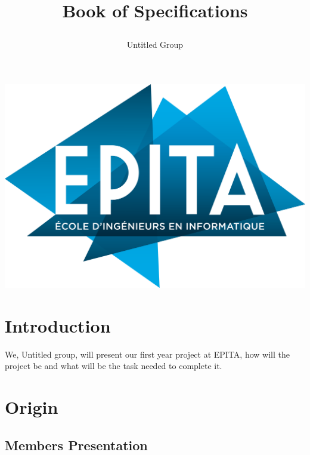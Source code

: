 \documentclass[a4paper, 11pt] {article}
\title{\begin{center} \hspace{1.5cm} Book of Specifications \end{center}}
\author{Untitled Group}
\begin{document}
\maketitle
\begin{center}
    \includegraphics[width = \linewidth]{Epita.png}
\end{center}

\newpage %

\tableofcontents %

\newpage

\section*{Introduction} %

\par
We, Untitled group, will present our first year project at EPITA, how will the project be and what will be the task needed to complete it.
\newline


\section{Origin}

\subsection{Members Presentation}
\end{document}
